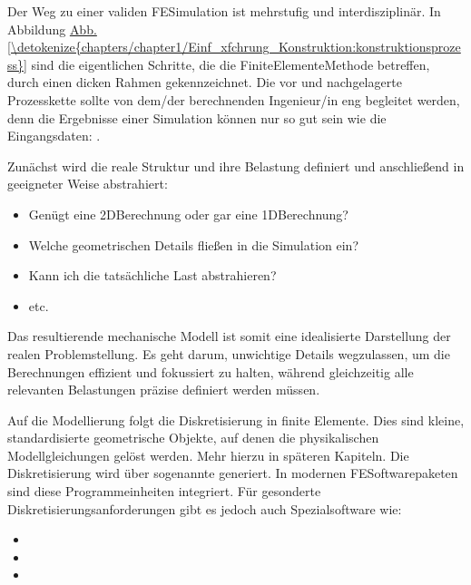 \documentclass[letterpaper,10pt,german]{jupyterBook}
\begin{document}
\sphinxAtStartPar
Der Weg zu einer validen FE\sphinxhyphen{}Simulation ist mehrstufig und interdisziplinär. In Abbildung \hyperref[\detokenize{chapters/chapter1/Einf_xfchrung_Konstruktion:konstruktionsprozess}]{Abb.\@ \ref{\detokenize{chapters/chapter1/Einf_xfchrung_Konstruktion:konstruktionsprozess}}} sind die eigentlichen Schritte, die die Finite\sphinxhyphen{}Elemente\sphinxhyphen{}Methode betreffen, durch einen dicken Rahmen gekennzeichnet. Die vor\sphinxhyphen{} und nachgelagerte Prozesskette sollte von dem/der berechnenden Ingenieur/in eng begleitet werden, denn die Ergebnisse einer Simulation können nur so gut sein wie die Eingangsdaten: .

\sphinxAtStartPar
Zunächst wird die reale Struktur und ihre Belastung definiert und anschließend in geeigneter Weise abstrahiert:
\begin{itemize}
\item {} 
\sphinxAtStartPar
Genügt eine 2D\sphinxhyphen{}Berechnung oder gar eine 1D\sphinxhyphen{}Berechnung?

\item {} 
\sphinxAtStartPar
Welche geometrischen Details fließen in die Simulation ein?

\item {} 
\sphinxAtStartPar
Kann ich die tatsächliche Last abstrahieren?

\item {} 
\sphinxAtStartPar
etc.

\end{itemize}

\sphinxAtStartPar
Das resultierende mechanische Modell ist somit eine idealisierte Darstellung der realen Problemstellung. Es geht darum, unwichtige Details wegzulassen, um die Berechnungen effizient und fokussiert zu halten, während gleichzeitig alle relevanten Belastungen präzise definiert werden müssen.

\sphinxAtStartPar
Auf die Modellierung folgt die Diskretisierung in finite Elemente. Dies sind kleine, standardisierte geometrische Objekte, auf denen die physikalischen Modellgleichungen gelöst werden. Mehr hierzu in späteren Kapiteln. Die Diskretisierung wird über sogenannte  generiert. In modernen FE\sphinxhyphen{}Softwarepaketen sind diese Programmeinheiten integriert. Für gesonderte Diskretisierungsanforderungen gibt es jedoch auch Spezialsoftware wie:
\begin{itemize}
\item {} 
\sphinxAtStartPar
{}

\item {} 
\sphinxAtStartPar
{}

\item {} 
\sphinxAtStartPar
{}

\end{itemize}
\end{document}
